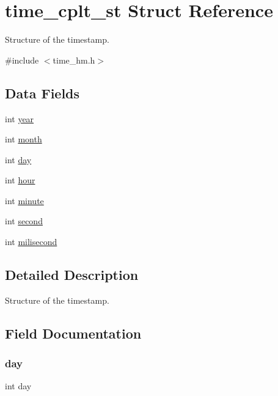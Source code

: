 \hypertarget{structtime__cplt__st}{}\section{time\+\_\+cplt\+\_\+st Struct Reference}
\label{structtime__cplt__st}


Structure of the timestamp.  




{\ttfamily \#include $<$time\+\_\+hm.\+h$>$}

\subsection*{Data Fields}
\begin{DoxyCompactItemize}
\item 
int \mbox{\hyperlink{structtime__cplt__st_abeac221e38b7b9ce7df8722c842bf671}{year}}
\item 
int \mbox{\hyperlink{structtime__cplt__st_aedb06abe5aff12fa3e7e0e71a374edfb}{month}}
\item 
int \mbox{\hyperlink{structtime__cplt__st_a4c11afc03fc3ee49bab660def6558f2a}{day}}
\item 
int \mbox{\hyperlink{structtime__cplt__st_a15df9ba285cfd842f284025f904edc9c}{hour}}
\item 
int \mbox{\hyperlink{structtime__cplt__st_a5edffad982a0566ad01d95005474eae3}{minute}}
\item 
int \mbox{\hyperlink{structtime__cplt__st_a6cf35be1947a62f134392fcb1b3c54d2}{second}}
\item 
int \mbox{\hyperlink{structtime__cplt__st_a5bfdb00d070117e7a6411f7e51269153}{milisecond}}
\end{DoxyCompactItemize}


\subsection{Detailed Description}
Structure of the timestamp. 

\subsection{Field Documentation}
\mbox{\label{structtime__cplt__st_a4c11afc03fc3ee49bab660def6558f2a}} 
\subsubsection{\texorpdfstring{day}{day}}
{\footnotesize\ttfamily int day}

